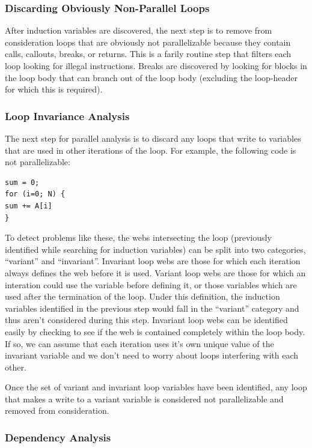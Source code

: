 \documentclass[11pt]{article}
\begin{document}
\subsubsection {Discarding Obviously Non-Parallel Loops} 

After induction variables are discovered, the next step is to remove
from consideration loops that are obviously not parallelizable because
they contain calls, callouts, breaks, or returns. This is a farily
routine step that filters each loop looking for illegal
instructions. Breaks are discovered by looking for blocks in the loop
body that can branch out of the loop body (excluding the loop-header for
which this is required). 

\subsubsection {Loop Invariance Analysis} 

The next step for parallel analysis is to discard any loops that write
to variables that are used in other iterations of the loop. For
example, the following code is not parallelizable: 

\begin{verbatim}
sum = 0;
for (i=0; N) { 
sum += A[i] 
}
\end{verbatim}

To detect problems like these, the webs intersecting the loop
(previously identified while searching for induction variables) can be
split into two categories, ``variant'' and ``invariant''. Invariant
loop webs are those for which each iteration always defines the web
before it is used. Variant loop webs are those for which an interation
could use the variable before defining it, or those variables which are used
after the termination of the loop. Under this definition, the
induction variables identified in the previous step would fall in the
``variant'' category and thus aren't considered during this
step. Invariant loop webs can be identified easily by checking to see
if the web is contained completely within the loop body. If so, we can
assume that each iteration uses it's own unique value of the invariant
variable and we don't need to worry about loops interfering with each
other. 

Once the set of variant and invariant loop variables have been
identified, any loop that makes a write to a variant variable is
considered not parallelizable and removed from consideration. 

\subsubsection {Dependency Analysis}
\end{document}
